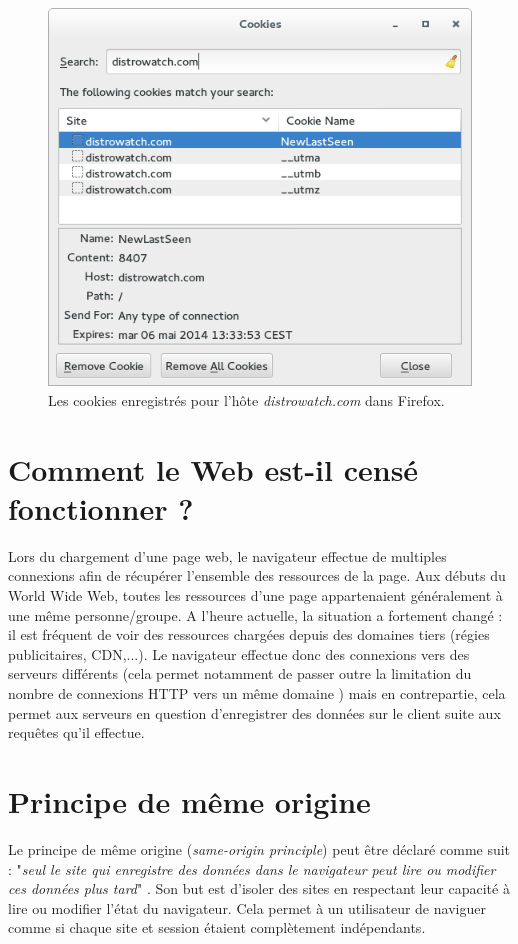 \begin{figure}[h]
	\centering
	\includegraphics[scale=0.7]{figures/cookies_distrowatch.png}
	\caption{\label{cookies_distrowatch}Les cookies enregistrés pour l'hôte \textit{distrowatch.com} dans Firefox.}
\end{figure}


\section{Comment le Web est-il censé fonctionner ?}
Lors du chargement d'une page web, le navigateur effectue de multiples connexions afin de récupérer l'ensemble des ressources de la page. Aux débuts du World Wide Web, toutes les ressources d'une page appartenaient généralement à une même personne/groupe. A l'heure actuelle, la situation a fortement changé : il est fréquent de voir des ressources chargées depuis des domaines tiers (régies publicitaires, CDN,...). Le navigateur effectue donc des connexions vers des serveurs différents (cela permet notamment de passer outre la limitation du nombre de connexions HTTP vers un même domaine \cite{IETF_RFC2616}) mais en contrepartie, cela permet aux serveurs en question d'enregistrer des données sur le client suite aux requêtes qu'il effectue.


\section{Principe de même origine}
\label{sop}
Le principe de même origine (\textit{same-origin principle}) peut être déclaré comme suit : "\textit{seul le site qui enregistre des données dans le navigateur peut lire ou modifier ces données plus tard}" \cite{Jackson:2006:PBS:1135777.1135884}. Son but est d'isoler des sites en respectant leur capacité à lire ou modifier l'état du navigateur. Cela permet à un utilisateur de naviguer comme si chaque site et session étaient complètement indépendants.
\newline

